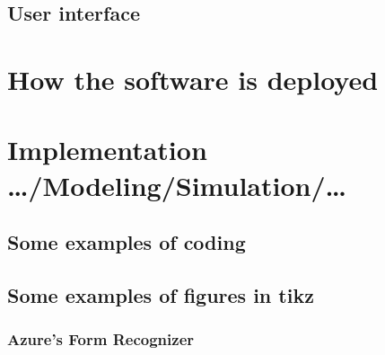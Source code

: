 \subsection{User interface}


\section{How the software is deployed}











\section{Implementation …/Modeling/Simulation/…}
\label{sec:implementationDetails}


\subsection{Some examples of coding}




\subsection{Some examples of figures in tikz}




\subsubsection{Azure's Form Recognizer}


\cleardoublepage
